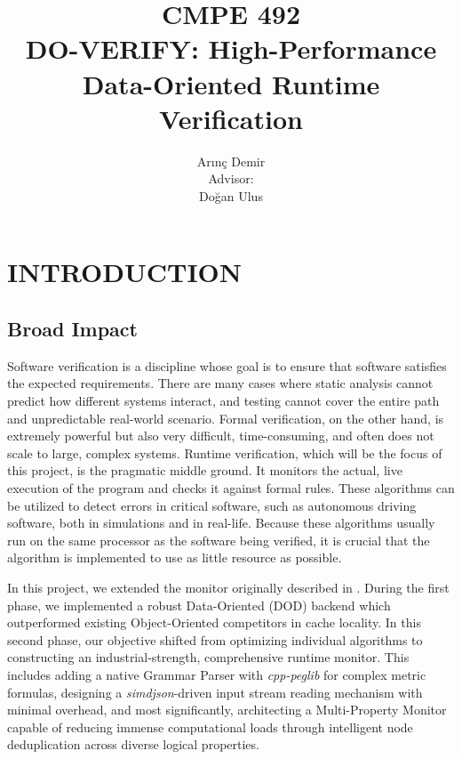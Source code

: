 \documentclass[a4paper,12pt]{report}
\begin{document}
\title{CMPE 492 \\ DO-VERIFY: High-Performance Data-Oriented Runtime Verification}
\author{
Arınç Demir \\
Advisor:\\ 
Doğan Ulus
}
\date{}
\maketitle{}
\tableofcontents

\chapter{INTRODUCTION}

\section{Broad Impact}


Software verification is a discipline whose goal is to ensure that software satisfies the expected requirements. There are many cases where static analysis cannot predict how different systems interact, and testing cannot cover the entire path and unpredictable real-world scenario. Formal verification, on the other hand, is extremely powerful but also very difficult, time-consuming, and often does not scale to large, complex systems. Runtime verification, which will be the focus of this project, is the pragmatic middle ground. It monitors the actual, live execution of the program and checks it against formal rules. These algorithms can be utilized to detect errors in critical software, such as autonomous driving software, both in simulations and in real-life. Because these algorithms usually run on the same processor as the software being verified, it is crucial that the algorithm is implemented to use as little resource as possible. 

In this project, we extended the monitor originally described in \cite{Ulus19}. During the first phase, we implemented a robust Data-Oriented (DOD) backend which outperformed existing Object-Oriented competitors in cache locality. In this second phase, our objective shifted from optimizing individual algorithms to constructing an industrial-strength, comprehensive runtime monitor. This includes adding a native Grammar Parser with \textit{cpp-peglib} for complex metric formulas, designing a \textit{simdjson}-driven input stream reading mechanism with minimal overhead, and most significantly, architecting a Multi-Property Monitor capable of reducing immense computational loads through intelligent node deduplication across diverse logical properties. 
\end{document}
